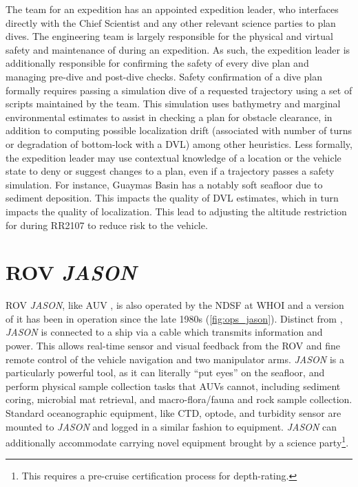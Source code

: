 The \Sentry team for an expedition has an appointed expedition leader, who interfaces directly with the Chief Scientist and any other relevant science parties to plan \Sentry dives. The \Sentry engineering team is largely responsible for the physical and virtual safety and maintenance of \Sentry during an expedition. As such, the expedition leader is additionally responsible for confirming the safety of every dive plan and managing pre-dive and post-dive checks. Safety confirmation of a dive plan formally requires passing a simulation dive of a requested trajectory using a set of scripts maintained by the \Sentry team. This simulation uses bathymetry and marginal environmental estimates to assist in checking a plan for obstacle clearance, in addition to computing possible localization drift (associated with number of turns or degradation of bottom-lock with a DVL) among other heuristics. Less formally, the expedition leader may use contextual knowledge of a location or the vehicle state to deny or suggest changes to a plan, even if a trajectory passes a safety simulation. For instance, Guaymas Basin has a notably soft seafloor due to sediment deposition. This impacts the quality of DVL estimates, which in turn impacts the quality of \Sentry localization. This lead to adjusting the altitude restriction for \Sentry during RR2107 to reduce risk to the vehicle.


\section{ROV \emph{JASON}}
ROV \emph{JASON}, like AUV \Sentry, is also operated by the NDSF at WHOI \autocite{ballard1993medea,yoerger1986jason,petitt2004power} and a version of it has been in operation since the late 1980s (\cref{fig:ops_jason}). Distinct from \Sentry, \emph{JASON} is connected to a ship via a cable which transmits information and power. This allows real-time sensor and visual feedback from the ROV and fine remote control of the vehicle navigation and two manipulator arms. \emph{JASON} is a particularly powerful tool, as it can literally ``put eyes'' on the seafloor, and perform physical sample collection tasks that AUVs cannot, including sediment coring, microbial mat retrieval, and macro-flora/fauna and rock sample collection. Standard oceanographic equipment, like CTD, optode, and turbidity sensor are mounted to \emph{JASON} and logged in a similar fashion to \Sentry equipment. \emph{JASON} can additionally accommodate carrying novel equipment brought by a science party\footnote{This requires a pre-cruise certification process for depth-rating.}. 

